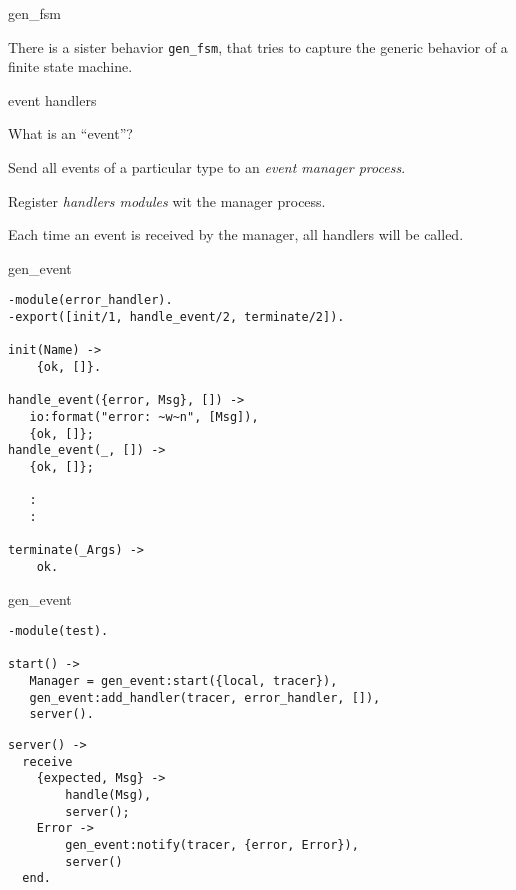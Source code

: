 \begin{frame}[fragile]{gen\_fsm}

\pause\vspace{20pt}
There is a sister behavior {\tt gen\_fsm}, that tries to capture the
generic behavior of a finite state machine.


\end{frame}


\begin{frame}[fragile]{event handlers}

What is an ``event''?

\pause\vspace{20pt} 
Send all events of a particular type to an {\em event manager process}. 

\pause\vspace{20pt} 
Register {\em handlers modules} wit the manager process.

\pause\vspace{20pt} 
Each time an event is received by the manager, all handlers will be called.

\end{frame}

\begin{frame}[fragile]{gen\_event}

\begin{verbatim}
-module(error_handler).
-export([init/1, handle_event/2, terminate/2]).

init(Name) ->
    {ok, []}.

handle_event({error, Msg}, []) ->
   io:format("error: ~w~n", [Msg]),
   {ok, []};
handle_event(_, []) ->
   {ok, []};

   :
   :

terminate(_Args) ->
    ok.
\end{verbatim}

\end{frame}


\begin{frame}[fragile]{gen\_event}

\begin{verbatim}
-module(test).

start() ->
   Manager = gen_event:start({local, tracer}),
   gen_event:add_handler(tracer, error_handler, []),
   server().
\end{verbatim}



\begin{verbatim}
server() ->
  receive 
    {expected, Msg} ->
        handle(Msg),
        server();
    Error ->
        gen_event:notify(tracer, {error, Error}),
        server()
  end.
\end{verbatim}

\end{frame}


